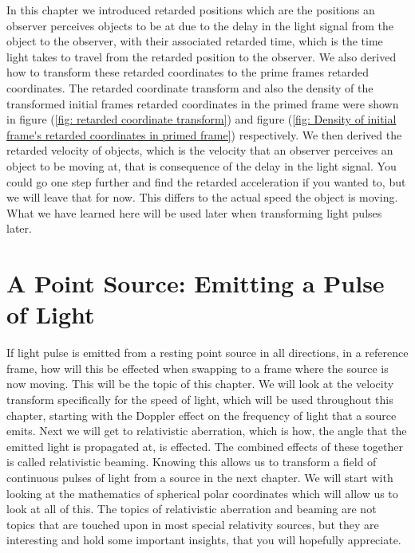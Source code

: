 In this chapter we introduced retarded positions which are the positions an observer perceives objects to be at due to the delay in the light signal from the object to the observer, with their associated retarded time, which is the time light takes to travel from the retarded position to the observer.
We also derived how to transform these retarded coordinates to the prime frames retarded coordinates.
The retarded coordinate transform and also the density of the transformed initial frames retarded coordinates in the primed frame were shown in figure (\ref{fig: retarded coordinate transform}) and figure (\ref{fig: Density of initial frame's retarded coordinates in primed frame}) respectively.
We then derived the retarded velocity of objects, which is the velocity that an observer perceives an object to be moving at, that is consequence of the delay in the light signal.
You could go one step further and find the retarded acceleration if you wanted to, but we will leave that for now.
This differs to the actual speed the object is moving.
What we have learned here will be used later when transforming light pulses later.



\printbibliography[segment=\therefsegment, heading=subbibliography]

\chapter{A Point Source: Emitting a Pulse of Light} \label{ch: A Point Source Emitting a Pulse of Light}

If light pulse is emitted from a resting point source in all directions, in a reference frame, how will this be effected when swapping to a frame where the source is now moving.
This will be the topic of this chapter.
We will look at the velocity transform specifically for the speed of light, which will be used throughout this chapter, starting with the Doppler effect on the frequency of light that a source emits.
Next we will get to relativistic aberration, which is how, the angle that the emitted light is propagated at, is effected.
The combined effects of these together is called relativistic beaming.
Knowing this allows us to transform a field of continuous pulses of light from a source in the next chapter.
We will start with looking at the mathematics of spherical polar coordinates which will allow us to look at all of this.
The topics of relativistic aberration and beaming are not topics that are touched upon in most special relativity sources, but they are interesting and hold some important insights, that you will hopefully appreciate.

